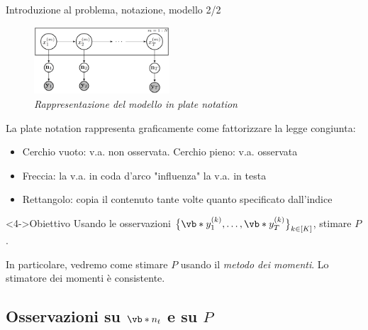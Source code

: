 \documentclass[10pt,xcolor={table,dvipsnames}]{beamer} 		%
\theoremstyle{plain}					%
\theoremstyle{definition}
\theoremstyle{remark}
\begin{document}
	\begin{frame}{Introduzione al problema, notazione, modello 2/2}
		\begin{figure}[ht]
			\centering
			\includegraphics[width=0.45\textwidth]{Immagini/plate_model.png}
			\caption{\emph{Rappresentazione del modello in plate notation}}
		\end{figure}

		\vspace*{-0.5\baselineskip}
		La plate notation rappresenta graficamente come fattorizzare la legge congiunta:
		\begin{itemize}
			\item Cerchio vuoto: v.a. non osservata. Cerchio pieno: v.a. osservata
			\item<2-> Freccia: la v.a. in coda d'arco "influenza" la v.a. in testa
			\item<3-> Rettangolo: copia il contenuto tante volte quanto specificato dall'indice
		\end{itemize}

		\begin{alertblock}<4->{Obiettivo}
			Usando le osservazioni
			$\big\{\vb*{y}_1^{(k)},\dots,\vb*{y}_T^{(k)}\big\}_{k\in [K]}$, stimare $P$.

			In particolare, vedremo come stimare $P$ usando il \emph{metodo dei momenti}.
			Lo stimatore dei momenti è consistente. 
		\end{alertblock}

	\end{frame}


	\subsection{Osservazioni su \texorpdfstring{$\vb*{n}_t$}{n_t} e su \texorpdfstring{$P$}{P}}
\end{document}
